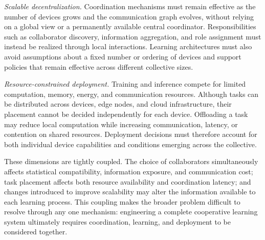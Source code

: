 \emph{Scalable decentralization.}
Coordination mechanisms must remain effective as the number of devices grows 
 and the communication graph evolves, without relying on a global view 
 or a permanently available central coordinator.
%
Responsibilities such as collaborator discovery, information aggregation, 
 and role assignment must instead be realized through local interactions.
%
Learning architectures must also avoid assumptions about a fixed number 
 or ordering of devices and support policies that remain effective 
 across different collective sizes.

\emph{Resource-constrained deployment.}
Training and inference compete for limited computation, memory, energy, 
 and communication resources.
%
Although tasks can be distributed across devices, edge nodes, and cloud infrastructure, 
 their placement cannot be decided independently for each device.
%
Offloading a task may reduce local computation while increasing communication, latency, 
 or contention on shared resources.
%
Deployment decisions must therefore account for both individual device capabilities 
 and conditions emerging across the collective.

These dimensions are tightly coupled.
%
The choice of collaborators simultaneously affects statistical compatibility, 
 information exposure, and communication cost; 
 task placement affects both resource availability and coordination latency; 
 and changes introduced to improve scalability may alter the information 
 available to each learning process.
%
This coupling makes the broader problem difficult to resolve
 through any one mechanism:
 engineering a complete cooperative learning system ultimately requires
 coordination, learning, and deployment to be considered together.

